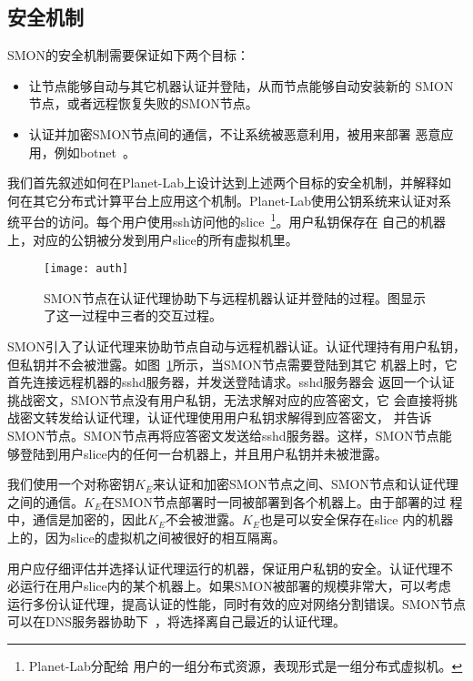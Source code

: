 \subsection{安全机制}
\label{subsec:security}

SMON的安全机制需要保证如下两个目标：

\begin{itemize}

  \item 让节点能够自动与其它机器认证并登陆，从而节点能够自动安装新的
  SMON节点，或者远程恢复失败的SMON节点。

  \item 认证并加密SMON节点间的通信，不让系统被恶意利用，被用来部署
  恶意应用，例如botnet~\cite{botnet}。

\end{itemize}

我们首先叙述如何在Planet-Lab上设计达到上述两个目标的安全机制，并解释如
何在其它分布式计算平台上应用这个机制。Planet-Lab使用公钥系统来认证对系
统平台的访问。每个用户使用ssh访问他的slice~\footnote{Planet-Lab分配给
用户的一组分布式资源，表现形式是一组分布式虚拟机。}。用户私钥保存在
自己的机器上，对应的公钥被分发到用户slice的所有虚拟机里。

\begin{figure}
\centering
  \begin{minipage}{0.8\linewidth}
    \centering
    \texttt{[image: auth]}
    \caption{SMON节点在认证代理协助下与远程机器认证并登陆的过程。图显示
    了这一过程中三者的交互过程。}
    \label{fig:auth}
  \end{minipage}
\end{figure}

SMON引入了认证代理来协助节点自动与远程机器认证。认证代理持有用户私钥，
但私钥并不会被泄露。如图~\ref{fig:auth}所示，当SMON节点需要登陆到其它
机器上时，它首先连接远程机器的sshd服务器，并发送登陆请求。sshd服务器会
返回一个认证挑战密文，SMON节点没有用户私钥，无法求解对应的应答密文，它
会直接将挑战密文转发给认证代理，认证代理使用用户私钥求解得到应答密文，
并告诉SMON节点。SMON节点再将应答密文发送给sshd服务器。这样，SMON节点能
够登陆到用户slice内的任何一台机器上，并且用户私钥并未被泄露。

我们使用一个对称密钥$K_E$来认证和加密SMON节点之间、SMON节点和认证代理
之间的通信。$K_E$在SMON节点部署时一同被部署到各个机器上。由于部署的过
程中，通信是加密的，因此$K_E$不会被泄露。$K_E$也是可以安全保存在slice
内的机器上的，因为slice的虚拟机之间被很好的相互隔离。

用户应仔细评估并选择认证代理运行的机器，保证用户私钥的安全。认证代理不
必运行在用户slice内的某个机器上。如果SMON被部署的规模非常大，可以考虑
运行多份认证代理，提高认证的性能，同时有效的应对网络分割错误。SMON节点
可以在DNS服务器协助下~\cite{dns_akamai}，将选择离自己最近的认证代理。

